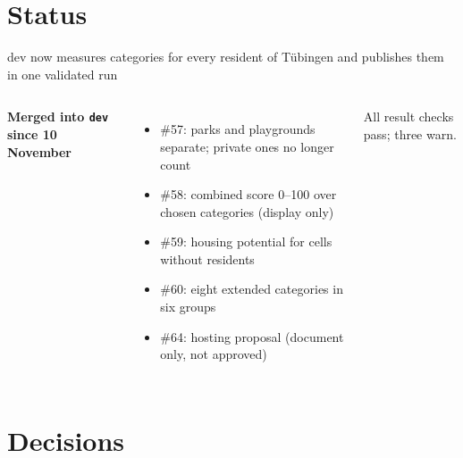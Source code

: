 \documentclass[aspectratio=169,10pt]{beamer}
\begin{document}
\section{Status}

\begin{frame}{dev now measures \factCurCategories{} categories for every resident of Tübingen
  and publishes them in one validated run}
  \begin{columns}[T,onlytextwidth]
      \par\bigskip
      \par\bigskip
      \textbf{Merged into \texttt{dev} since 10 November}
      \begin{itemize}\footnotesize
        \item \#57: parks and playgrounds separate; private ones no longer count
        \item \#58: combined score 0--100 over chosen categories (display only)
        \item \#59: housing potential for cells without residents
        \item \#60: eight extended categories in six groups
        \item \#64: hosting proposal (document only, not approved)
      \end{itemize}
      {\footnotesize All \factCurChecks{} result checks pass; three warn.}
  \end{columns}
\end{frame}

\section{Decisions}
\end{document}
